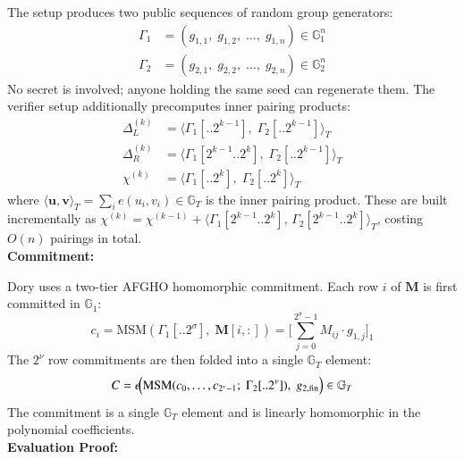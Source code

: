The setup produces two public sequences of random group generators:
\begin{align}
    \Gamma_1 &= (g_{1,1},\; g_{1,2},\; \ldots,\; g_{1,n}) \in \mathbb{G}_1^n \\
    \Gamma_2 &= (g_{2,1},\; g_{2,2},\; \ldots,\; g_{2,n}) \in \mathbb{G}_2^n
\end{align}
No secret is involved; anyone holding the same seed can regenerate them.
The verifier setup additionally precomputes inner pairing products:
\begin{align}
    \Delta_L^{(k)} &=
        \bigl\langle \Gamma_1[..2^{k-1}],\;\Gamma_2[..2^{k-1}]\bigr\rangle_T \\
    \Delta_R^{(k)} &=
        \bigl\langle \Gamma_1[2^{k-1}..2^k],\;\Gamma_2[..2^{k-1}]\bigr\rangle_T \\
    \chi^{(k)} &=
        \bigl\langle \Gamma_1[..2^k],\;\Gamma_2[..2^k]\bigr\rangle_T
\end{align}
where $\langle \mathbf{u},\mathbf{v}\rangle_T = \sum_i e(u_i, v_i) \in
\mathbb{G}_T$ is the inner pairing product. These are built incrementally as
$\chi^{(k)} = \chi^{(k-1)} + \langle \Gamma_1[2^{k-1}..2^k],\,
\Gamma_2[2^{k-1}..2^k]\rangle_T$, costing $O(n)$ pairings in total.
\\
\textbf{Commitment:}

Dory uses a two-tier AFGHO homomorphic commitment. Each row $i$ of
$\mathbf{M}$ is first committed in $\mathbb{G}_1$:
\begin{equation}
    c_i = \mathrm{MSM}\!\left(\Gamma_1[..2^\sigma],\; \mathbf{M}[i,:]\right)
        = \Biggl[\sum_{j=0}^{2^\sigma-1} M_{ij}\cdot g_{1,j}\Biggr]_1
\end{equation}
The $2^\nu$ row commitments are then folded into a single $\mathbb{G}_T$
element:
\begin{equation}
    C = e\!\Bigl(\mathrm{MSM}(c_0,\ldots,c_{2^\nu-1};\;\Gamma_2[..2^\nu]),\;
    g_{2,\mathrm{fin}}\Bigr) \in \mathbb{G}_T
\end{equation}
The commitment is a single $\mathbb{G}_T$ element and is linearly homomorphic
in the polynomial coefficients.
\\
\textbf{Evaluation Proof:}

